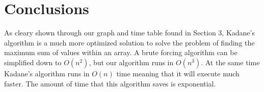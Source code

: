 \documentclass[10pt, letterpaper]{article}
\begin{document}
	\section{Conclusions}
	As cleary shown through our graph and time table found in Section 3,
	Kadane's algorithm is a much more optimized solution to solve the problem of finding the maximum sum of values within an array. 
	A brute forcing algorithm can be simplified down to $O(n^2)$, but our algorithm runs in $O(n^3)$.
	At the same time Kadane's algorithm runs in $O(n)$ time meaning that it will execute much faster.
	The amount of time that this algorithm saves is exponential.
	
\end{document}

